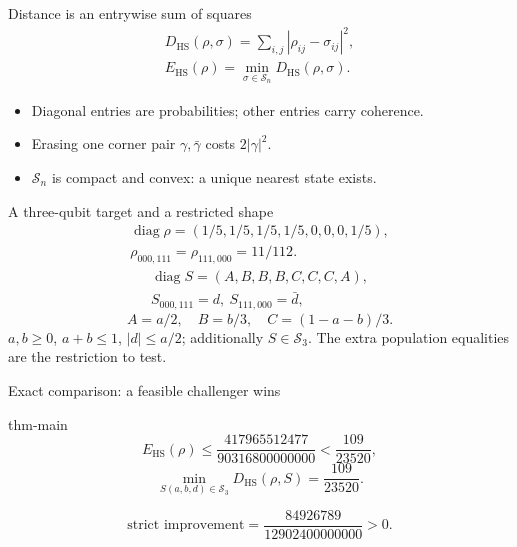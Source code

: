 \documentclass{beamer}
\begin{document}
\begin{frame}{Distance is an entrywise sum of squares}
\[
\begin{gathered}
D_{\mathrm{HS}}(\rho,\sigma)=\sum_{i,j}|\rho_{ij}-\sigma_{ij}|^2,\\
E_{\mathrm{HS}}(\rho)=\min_{\sigma\in\mathcal S_n}D_{\mathrm{HS}}(\rho,\sigma).
\end{gathered}
\]
\begin{itemize}
\item Diagonal entries are probabilities; other entries carry coherence.
\item Erasing one corner pair $\gamma,\bar\gamma$ costs $2|\gamma|^2$.
\item $\mathcal S_n$ is compact and convex: a unique nearest state exists.
\end{itemize}
\end{frame}
\begin{frame}{A three-qubit target and a restricted shape}
\[
\begin{gathered}
\operatorname{diag}\rho=(1/5,1/5,1/5,1/5,0,0,0,1/5),\\
\rho_{000,111}=\rho_{111,000}=11/112.
\end{gathered}
\]
\[
\begin{gathered}
\operatorname{diag}S=(A,B,B,B,C,C,C,A),\\
S_{000,111}=d,\ S_{111,000}=\bar d,
\end{gathered}
\]
\[
A=a/2,\quad B=b/3,\quad C=(1-a-b)/3.
\]
$a,b\ge0$, $a+b\le1$, $|d|\le a/2$; additionally $S\in\mathcal S_3$.
\medskip
\alert{The extra population equalities are the restriction to test.}
\end{frame}
\begin{frame}{Exact comparison: a feasible challenger wins}
\begin{bookresult}{thm-main}
\[
E_{\mathrm{HS}}(\rho)\le\frac{417965512477}{90316800000000}
<\frac{109}{23520},
\]
\[
\min_{S(a,b,d)\in\mathcal S_3}D_{\mathrm{HS}}(\rho,S)=\frac{109}{23520}.
\]
\end{bookresult}
\[
\text{strict improvement}=\frac{84926789}{12902400000000}>0.
\]
\end{frame}
\end{document}
